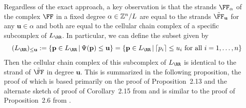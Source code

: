 \documentclass{amsart}
\begin{document}
Regardless of the exact approach, a key observation is that the strands $\FF_{\alpha}$ of the complex $\FF$ in a fixed degree $\alpha\in \mathbb Z^n/L$ are equal to the strands $\tilde \FF_{\mathbf{u}}$ for any $\mathbf{u}\in \alpha$ and both are equal to the cellular chain complex of a specific subcomplex of $L_{\RR}$. In particular, we can define the subset given by
\[(L_{\RR})_{\leq \mathbf{u}}:= \{\mathbf{p}\in L_{\RR} \,|\, \Psi(\mathbf{p})\leq \mathbf{u}\} = \{\mathbf{p}\in L_{\RR} \,|\, \lceil p_i\rceil \leq u_i\text{ for all } i=1,\ldots,n\}\]
Then the cellular chain complex of this subcomplex of $L_{\RR}$ is identical to the strand of $\tilde \FF$ in degree $\mathbf{u}$. This is summarized in the following proposition, the proof of which is based primarily on the proof of Proposition~2.13 and the alternate sketch of proof of Corollary~2.15 from \cite{BCS+25} and is similar to the proof of Proposition~2.6 from \cite{BH25}.
\end{document}
